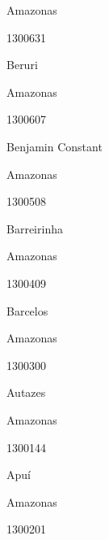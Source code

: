 \documentclass[
  letterpaper,
]{report}
\begin{document}
\n      

Amazonas

\n      

1300631

\n      

Beruri

\n    

\n    

\n      

Amazonas

\n      

1300607

\n      

Benjamin Constant

\n    

\n    

\n      

Amazonas

\n      

1300508

\n      

Barreirinha

\n    

\n    

\n      

Amazonas

\n      

1300409

\n      

Barcelos

\n    

\n    

\n      

Amazonas

\n      

1300300

\n      

Autazes

\n    

\n    

\n      

Amazonas

\n      

1300144

\n      

Apuí

\n    

\n    

\n      

Amazonas

\n      

1300201

\n      
\end{document}
